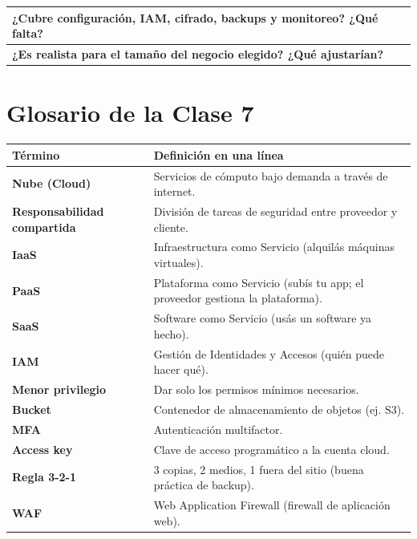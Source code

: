 \documentclass[12pt,a4paper]{article}
\renewcommand{\arraystretch}{1.25}
\begin{document}
\vspace{10pt}
\begin{cajaActividad}[title={Autoevaluaci\'on de la checklist}]
\renewcommand{\arraystretch}{1.5}
\begin{tabularx}{\textwidth}{|X|}
\hline
\textbf{¿Cubre configuraci\'on, IAM, cifrado, backups y monitoreo? ¿Qu\'e falta?} \\[1.8cm]
\hline
\textbf{¿Es realista para el tama\~no del negocio elegido? ¿Qu\'e ajustar\'ian?} \\[1.8cm]
\hline
\end{tabularx}
\end{cajaActividad}

\newpage
\section{Glosario de la Clase 7}

\renewcommand{\arraystretch}{1.4}
\begin{tabularx}{\textwidth}{>{\bfseries}p{4.5cm}X}
\toprule
\textbf{T\'ermino} & \textbf{Definici\'on en una l\'inea} \\
\midrule
Nube (Cloud) & Servicios de c\'omputo bajo demanda a trav\'es de internet. \\
Responsabilidad compartida & Divisi\'on de tareas de seguridad entre proveedor y cliente. \\
IaaS & Infraestructura como Servicio (alquil\'as m\'aquinas virtuales). \\
PaaS & Plataforma como Servicio (sub\'is tu app; el proveedor gestiona la plataforma). \\
SaaS & Software como Servicio (us\'as un software ya hecho). \\
IAM & Gesti\'on de Identidades y Accesos (qui\'en puede hacer qu\'e). \\
Menor privilegio & Dar solo los permisos m\'inimos necesarios. \\
Bucket & Contenedor de almacenamiento de objetos (ej. S3). \\
MFA & Autenticaci\'on multifactor. \\
Access key & Clave de acceso program\'atico a la cuenta cloud. \\
Regla 3-2-1 & 3 copias, 2 medios, 1 fuera del sitio (buena pr\'actica de backup). \\
WAF & Web Application Firewall (firewall de aplicaci\'on web). \\
\bottomrule
\end{tabularx}
\end{document}
